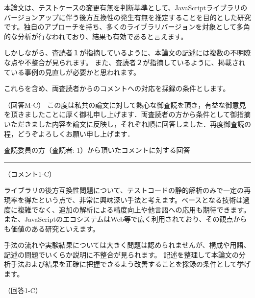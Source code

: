 \documentclass{jarticle} %
\def\section#1{ \vspace{3pc} {\large \gt #1} \vspace{1pc} \hrule }
\def\subsection#1{ \vspace{1pc} {\gt #1} }
\begin{document}
本論文は、テストケースの変更有無を判断基準として、JavaScriptライブラリのバージョンアップに伴う後方互換性の発生有無を推定することを目的とした研究です。独自のアプローチを持ち、多くのライブラリバージョンを対象として多角的な分析が行なわれており、結果も有効であると言えます。

しかしながら、査読者１が指摘しているように、本論文の記述には複数の不明瞭な点や不整合が見られます。
また、査読者２が指摘しているように、掲載されている事例の見直しが必要かと思われます。

これらを含め、両査読者からのコメントへの対応を採録の条件とします。


\subsection{（回答M-C）}
この度は私共の論文に対して熱心な御査読を頂き，有益な御意見を頂きましたことに厚く御礼申し上げます．両査読者の方から条件として御指摘いただきました内容を論文に反映し，それぞれ順に回答しました．再度御査読の程，どうぞよろしくお願い申し上げます．


\newpage
\section{査読委員の方（査読者: 1）から頂いたコメントに対する回答}
\subsection{（コメント1-C）}

ライブラリの後方互換性問題について、テストコードの静的解析のみで一定の再現率を得たという点で、非常に興味深い手法と考えます。ベースとなる技術は過度に複雑でなく、追加の解析による精度向上や他言語への応用も期待できます。
また、JavaScriptのエコシステムはWeb等で広く利用されており、その観点からも価値のある研究といえます。

手法の流れや実験結果については大きく問題は認められませんが、構成や用語、記述の問題でいくらか説明に不整合が見られます。
記述を整理して本論文の分析手法および結果を正確に把握できるよう改善することを採録の条件として挙げます。

\subsection{（回答1-C）}
\end{document}
